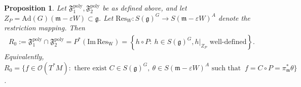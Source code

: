 \documentclass[11pt]{amsart}
\newtheorem{proposition}[theorem]{Proposition}
\theoremstyle{definition}
\theoremstyle{plain}
\theoremstyle{conclusion}
\begin{document}

\begin{proposition}
\label{prop:inter} Let $\mathfrak{F}_1^{\mathrm{poly}},\mathfrak{F}_2^{\mathrm{poly}}$ be as defined above, and let $Z_P = \mathrm{Ad}(G)(\mathfrak{m} - \varepsilon W) \subset \mathfrak{g}$. Let $\mathrm{Res}_W:S(\mathfrak{g})^G \rightarrow S(\mathfrak{m}-\varepsilon W)^A$ denote the restriction mapping. Then \begin{align}
    R_0:=\mathfrak{F}_1^{\mathrm{poly}} \cap \mathfrak{F}_2^{\mathrm{poly}}= P^* \left(\mathrm{Im \,Res_W}\right) = \left\{ h\circ P :\ h\in S(\mathfrak{g})^G, h\vert_{Z_P}\text{ well-defined} \right\}.
\end{align} Equivalently, $R_0=\{ f\in\mathcal{O}(T^*M):   \text{ there exist } C\in S(\mathfrak{g})^G,\ \theta\in S(\mathfrak{m}-\varepsilon W)^A \text{ such that }\ f=C \circ P= \pi_{\mathfrak{m}}^* \theta \}$.
\end{proposition}
\end{document}

